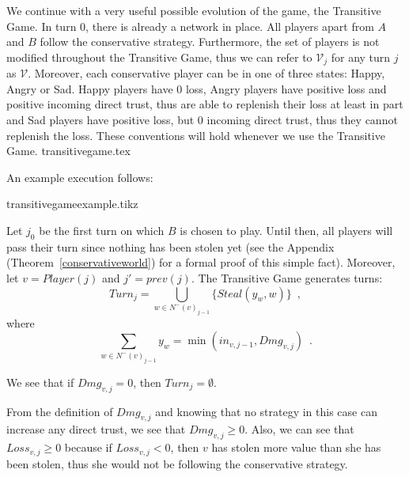   We continue with a very useful possible evolution of the game, the Transitive Game. In turn 0, there is already a network
  in place. All players apart from $A$ and $B$ follow the conservative strategy. Furthermore, the set of players is not
  modified throughout the Transitive Game, thus we can refer to $\mathcal{V}_j$ for any turn $j$ as $\mathcal{V}$.
  Moreover, each conservative player can be in one of three states: Happy, Angry or Sad. Happy players have 0 loss, Angry
  players have positive loss and positive incoming direct trust, thus are able to replenish their loss at least in part and
  Sad players have positive loss, but 0 incoming direct trust, thus they cannot replenish the loss. These conventions will
  hold whenever we use the Transitive Game.
  {transitivegame.tex}

  \noindent An example execution follows:

  {transitivegameexample.tikz}

  \noindent Let $j_0$ be the first turn on which $B$ is chosen to play. Until then, all players will pass their turn since
  nothing has been stolen yet (see the Appendix (Theorem~\ref{conservativeworld}) for a formal proof of this simple fact).
  Moreover, let $v = Player(j)$ and $j' = prev\left(j\right)$.  The Transitive Game generates turns:
  \begin{equation}
    Turn_j = \bigcup\limits_{w \in N^{-}\left(v\right)_{j-1}}\{Steal\left(y_w,w\right)\} \enspace,
  \end{equation}
  where
  \begin{equation*}
    \sum\limits_{w \in N^{-}\left(v\right)_{j-1}}y_w = \min\left(in_{v, j-1}, Dmg_{v, j}\right) \enspace.
  \end{equation*}

  \noindent We see that if $Dmg_{v, j} = 0$, then $Turn_j = \emptyset$.

  From the definition of $Dmg_{v,j}$ and knowing that no strategy in this case can increase any direct trust, we see
  that $Dmg_{v,j} \geq 0$. Also, we can see that $Loss_{v,j} \geq 0$ because if $Loss_{v,j} < 0$, then $v$ has
  stolen more value than she has been stolen, thus she would not be following the conservative strategy.
